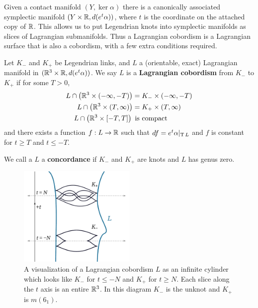 
Given a contact manifold $(Y, \ker \alpha)$ there is a canonically associated symplectic manifold $(Y \times \mathbb{R}, d(e^t \alpha))$, where $t$ is the coordinate on the attached copy of $\mathbb{R}$. This allows us to put Legendrian knots into symplectic manifolds as slices of Lagrangian submanifolds. Thus a Lagrangian cobordism is a Lagrangian surface that is also a cobordism, with a few extra conditions required.

\begin{definition}
    Let $K_-$ and $K_+$ be Legendrian links, and $L$ a (orientable, exact) Lagrangian manifold in $(\mathbb{R}^3 \times \mathbb{R}, d(e^t \alpha))$. We say $L$ is a \textbf{Lagrangian cobordism} from $K_-$ to $K_+$ if for some $T > 0$,
    \begin{align*}
        L \cap \left(\mathbb{R}^3 \times (-\infty, -T)\right) &= K_- \times (-\infty, -T)\\
        L \cap \left(\mathbb{R}^3 \times (T, \infty)\right) &= K_+ \times (T, \infty)\\
        L \cap \left(\mathbb{R}^3 \times [-T, T] \right)\, &\,\, \text{is compact}
    \end{align*}
    and there exists a function $f: L \to \mathbb{R}$ such that ${df = e^t \alpha |_{\operatorname{T} L}}$ and $f$ is constant for $t \geq T$ and $t \leq -T$.

    We call a $L$ a \textbf{concordance} if $K_-$ and $K_+$ are knots and $L$ has genus zero.

\end{definition}

\begin{figure}[ht]
    \centering
    \includegraphics[width=0.5\textwidth]{images/cobordism-visualization.pdf}
    \caption{A visualization of a Lagrangian cobordism $L$ as an infinite cylinder which looks like $K_-$ for $t \leq -N$ and $K_+$ for $t \geq N$. Each slice along the $t$ axis is an entire $\mathbb{R}^3$. In this diagram $K_-$ is the unknot and $K_+$ is $m(6_1)$.}%
    \label{fig:cobordism-vis}
\end{figure}

